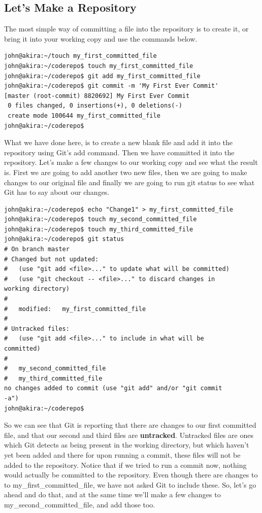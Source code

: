 \subsection{Let's Make a Repository}

The most simple way of committing a file into the repository is to create it, or bring it into your working copy and use the commands below.

\begin{Verbatim}[frame=single,fontsize=\relsize{-3}] 
john@akira:~/touch my_first_committed_file
john@akira:~/coderepo$ touch my_first_committed_file
john@akira:~/coderepo$ git add my_first_committed_file
john@akira:~/coderepo$ git commit -m 'My First Ever Commit'
[master (root-commit) 8820692] My First Ever Commit
 0 files changed, 0 insertions(+), 0 deletions(-)
 create mode 100644 my_first_committed_file
john@akira:~/coderepo$
\end{Verbatim} 

What we have done here, is to create a new blank file and add it into the repository using Git's add command.  Then we have committed it into the repository.  Let's make a few changes to our working copy and see what the result is.  First we are going to add another two new files, then we are going to make changes to our original file and finally we are going to run git status to see what Git has to say about our changes.

\begin{Verbatim}[frame=single,fontsize=\relsize{-3}] 
john@akira:~/coderepo$ echo "Change1" > my_first_committed_file 
john@akira:~/coderepo$ touch my_second_committed_file
john@akira:~/coderepo$ touch my_third_committed_file
john@akira:~/coderepo$ git status
# On branch master
# Changed but not updated:
#   (use "git add <file>..." to update what will be committed)
#   (use "git checkout -- <file>..." to discard changes in 
working directory)
#
#	modified:   my_first_committed_file
#
# Untracked files:
#   (use "git add <file>..." to include in what will be 
committed)
#
#	my_second_committed_file
#	my_third_committed_file
no changes added to commit (use "git add" and/or "git commit 
-a")
john@akira:~/coderepo$ 
\end{Verbatim} 

So we can see that Git is reporting that there are changes to our first committed file, and that our second and third files are \textbf{untracked}.  Untracked files are ones which Git detects as being present in the working directory, but which haven't yet been added and there for upon running a commit, these files will not be added to the repository.  Notice that if we tried to run a commit now, nothing would actually be committed to the repository.  Even though there are changes to to my\_first\_committed\_file, we have not asked Git to include these.  So, let's go ahead and do that, and at the same time we'll make a few changes to my\_second\_committed\_file, and add those too.


